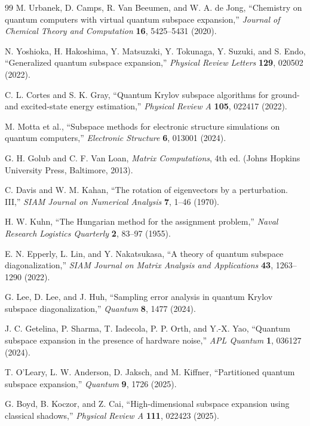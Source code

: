 \documentclass[
  reprint,
  amsmath,
  amssymb,
  aps,
  pra,
  nofootinbib,
  superscriptaddress,
  floatfix
]{revtex4-2}
\begin{document}
\begin{thebibliography}{99}
M. Urbanek, D. Camps, R. Van Beeumen, and W. A. de Jong,
``Chemistry on quantum computers with virtual quantum subspace expansion,''
\emph{Journal of Chemical Theory and Computation} \textbf{16}, 5425--5431 (2020).

N. Yoshioka, H. Hakoshima, Y. Matsuzaki, Y. Tokunaga, Y. Suzuki, and S. Endo,
``Generalized quantum subspace expansion,''
\emph{Physical Review Letters} \textbf{129}, 020502 (2022).

C. L. Cortes and S. K. Gray,
``Quantum Krylov subspace algorithms for ground- and excited-state energy estimation,''
\emph{Physical Review A} \textbf{105}, 022417 (2022).

M. Motta et al.,
``Subspace methods for electronic structure simulations on quantum computers,''
\emph{Electronic Structure} \textbf{6}, 013001 (2024).

G. H. Golub and C. F. Van Loan,
\emph{Matrix Computations}, 4th ed. (Johns Hopkins University Press, Baltimore, 2013).

C. Davis and W. M. Kahan,
``The rotation of eigenvectors by a perturbation. III,''
\emph{SIAM Journal on Numerical Analysis} \textbf{7}, 1--46 (1970).

H. W. Kuhn,
``The Hungarian method for the assignment problem,''
\emph{Naval Research Logistics Quarterly} \textbf{2}, 83--97 (1955).

E. N. Epperly, L. Lin, and Y. Nakatsukasa,
``A theory of quantum subspace diagonalization,''
\emph{SIAM Journal on Matrix Analysis and Applications} \textbf{43}, 1263--1290 (2022).

G. Lee, D. Lee, and J. Huh,
``Sampling error analysis in quantum Krylov subspace diagonalization,''
\emph{Quantum} \textbf{8}, 1477 (2024).

J. C. Getelina, P. Sharma, T. Iadecola, P. P. Orth, and Y.-X. Yao,
``Quantum subspace expansion in the presence of hardware noise,''
\emph{APL Quantum} \textbf{1}, 036127 (2024).

T. O'Leary, L. W. Anderson, D. Jaksch, and M. Kiffner,
``Partitioned quantum subspace expansion,''
\emph{Quantum} \textbf{9}, 1726 (2025).

G. Boyd, B. Koczor, and Z. Cai,
``High-dimensional subspace expansion using classical shadows,''
\emph{Physical Review A} \textbf{111}, 022423 (2025).


\end{thebibliography}
\end{document}
